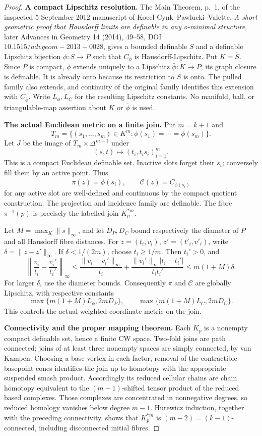 \begin{proof}
\textbf{A compact Lipschitz resolution.}
The Main Theorem, p.~1, of the inspected 5 September 2012 manuscript
of Kocel-Cynk--Pawlucki--Valette,
\emph{A short geometric proof that Hausdorff limits are definable
in any o-minimal structure}, later Advances in Geometry 14 (2014),
49--58, DOI \(10.1515/advgeom-2013-0028\), gives a bounded definable
\(S\) and a definable Lipschitz bijection \(\phi:S\to P\) such that
\(C_\phi\) is Hausdorff-Lipschitz. Put \(K=\overline S\).
Since \(P\) is compact, \(\phi\) extends uniquely to a Lipschitz
\(\bar\phi:K\to P\); its graph closure is definable.
It is already onto because its restriction to \(S\) is onto.
The pulled family also extends, and continuity of the original
family identifies this extension with \(C_{\bar\phi}\).
Write \(L_\phi,L_C\) for the resulting Lipschitz constants.
No manifold, ball, or triangulable-map assertion about \(K\) or
\(\bar\phi\) is used.

\textbf{The actual Euclidean metric on a finite join.}
Put \(m=k+1\) and
\[
 T_m=\{(s_1,\ldots,s_m)\in K^m:
                  \bar\phi(s_1)=\cdots=\bar\phi(s_m)\}.
\]
Let \(J\) be the image of \(T_m\times\Delta^{m-1}\) under
\[
 (s,t)\longmapsto(t_i,t_i s_i)_{i=1}^m.
 \tag{152.1}
\]
This is a compact Euclidean definable set. Inactive slots forget
their \(s_i\); conversely fill them by an active point.
Thus
\[
 \pi(z)=\bar\phi(s_i),\qquad
 \mathcal C(z)=C_{\bar\phi(s_i)}
 \tag{152.2}
\]
for any active slot are well-defined and continuous by the compact
quotient construction. The projection and incidence family are
definable. The fibre \(\pi^{-1}(p)\) is precisely the labelled
join \(K_p^{*m}\).

Let \(M=\max_K\|s\|_\infty\), and let \(D_P,D_C\) bound respectively
the diameter of \(P\) and all Hausdorff fibre distances.
For \(z=(t_i,v_i)\), \(z'=(t'_i,v'_i)\), write
\(\delta=\|z-z'\|_\infty\). If \(\delta<1/(2m)\), choose
\(t_i\ge1/m\). Then \(t_i'>0\), and
\[
 \left\|\frac{v_i}{t_i}-\frac{v_i'}{t_i'}\right\|_\infty
 \le
 \frac{\|v_i-v_i'\|_\infty}{t_i}
 +\frac{\|v_i'\|_\infty|t_i-t_i'|}{t_it_i'}
 \le m(1+M)\delta.
 \tag{152.3}
\]
For larger \(\delta\), use the diameter bounds.
Consequently \(\pi\) and \(\mathcal C\) are globally Lipschitz,
with respective constants
\[
 \max\{m(1+M)L_\phi,2mD_P\},
 \qquad
 \max\{m(1+M)L_C,2mD_C\}.
 \tag{152.4}
\]
This controls the actual weighted-coordinate metric on the join.

\textbf{Connectivity and the proper mapping theorem.}
Each \(K_p\) is a nonempty compact definable set, hence a finite CW
space. Two-fold joins are path connected; joins of at least three
nonempty spaces are simply connected, by van Kampen.
Choosing a base vertex in each factor, removal of the contractible
basepoint cones identifies the join up to homotopy with the
appropriate suspended smash product. Accordingly its reduced
cellular chains are chain homotopy equivalent to the
\((m-1)\)-shifted tensor product of the reduced based complexes.
Those complexes are concentrated in nonnegative degrees, so reduced
homology vanishes below degree \(m-1\).
Hurewicz induction, together with the preceding connectivity,
shows that \(K_p^{*m}\) is \((m-2)=(k-1)\)-connected, including
disconnected initial fibres.


\end{proof}
